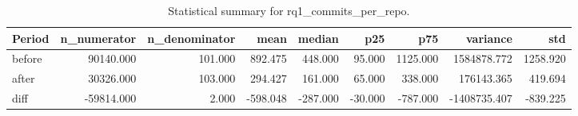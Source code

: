 \begin{table}[h]
\centering
\begin{tabular}{lrrrrrrrr}
\toprule
Period & n_numerator & n_denominator & mean & median & p25 & p75 & variance & std \\
\midrule
before & 90140.000 & 101.000 & 892.475 & 448.000 & 95.000 & 1125.000 & 1584878.772 & 1258.920 \\
after & 30326.000 & 103.000 & 294.427 & 161.000 & 65.000 & 338.000 & 176143.365 & 419.694 \\
diff & -59814.000 & 2.000 & -598.048 & -287.000 & -30.000 & -787.000 & -1408735.407 & -839.225 \\
\bottomrule
\end{tabular}
\caption{Statistical summary for rq1_commits_per_repo.}\label{tab:rq1_commits_per_repo}
\end{table}
